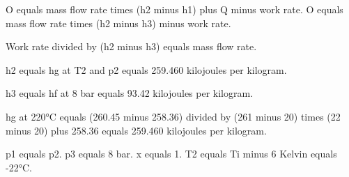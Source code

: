 O equals mass flow rate times (h2 minus h1) plus Q minus work rate.  
O equals mass flow rate times (h2 minus h3) minus work rate.  

Work rate divided by (h2 minus h3) equals mass flow rate.  

h2 equals hg at T2 and p2 equals 259.460 kilojoules per kilogram.  

h3 equals hf at 8 bar equals 93.42 kilojoules per kilogram.  

hg at 220°C equals (260.45 minus 258.36) divided by (261 minus 20) times (22 minus 20) plus 258.36 equals 259.460 kilojoules per kilogram.  

p1 equals p2.  
p3 equals 8 bar.  
x equals 1.  
T2 equals Ti minus 6 Kelvin equals -22°C.